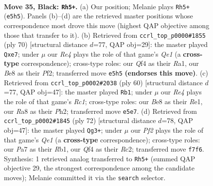 \documentclass[11pt]{article}
\begin{document}
\clearpage

\begin{figure}[p]\centering
\begin{subfigure}{0.46\textwidth}\centering
\resizebox{\linewidth}{!}{%
\newchessgame
\chessboard[
  setfen={r3b1k1/p4pP1/8/p3r3/4pq2/PP5K/1Q3P2/3RR3 b - - 1 35},
  showmover=false,
  pgfstyle=straightmove, color=movearrow, markmove={e5-h5}
]}
\caption{}
\end{subfigure}\hfill
\begin{subfigure}{0.46\textwidth}\centering
\resizebox{\linewidth}{!}{%
\newchessgame
\chessboard[
  setfen={6k1/r3qp2/2r3pp/P4B2/3p4/7P/2P2PP1/R3Q1K1 w - - 0 36},
  showmover=false,
  pgfstyle=straightmove, color=movearrow, markmove={e1-e7}
]}
\caption{}
\end{subfigure}
\\[4pt]
\begin{subfigure}{0.46\textwidth}\centering
\resizebox{\linewidth}{!}{%
\newchessgame
\chessboard[
  setfen={1r2r2k/6pp/8/p2QP3/8/qP6/6PP/2R1R1K1 w - - 1 31},
  showmover=false,
  pgfstyle=straightmove, color=movearrow, markmove={c1-b1}
]}
\caption{}
\end{subfigure}\hfill
\begin{subfigure}{0.46\textwidth}\centering
\resizebox{\linewidth}{!}{%
\newchessgame
\chessboard[
  setfen={1r1r4/6kp/pp6/3Bp2q/1PP2n2/8/2R4P/1R2Q2K w - - 4 37},
  showmover=false,
  pgfstyle=straightmove, color=movearrow, markmove={e1-g3}
]}
\caption{}
\end{subfigure}
\caption{\textbf{Move 35, Black: \texttt{Rh5+}.} (a) Our position; Melanie plays \texttt{Rh5+} (\texttt{e5h5}). Panels (b)--(d) are the retrieved master positions whose correspondence most drove this move (highest QAP objective among those that transfer to it). (b) Retrieved from \texttt{ccrl\_top\_p0000\#1855} (ply 70) [structural distance $d$=77, QAP obj=29]: the master played \texttt{Qxe7}; under $\mu$ our \emph{Re4} plays the role of that game's \emph{Qe1} (a \textbf{cross-type} correspondence); cross-type roles: our \emph{Q}f4 as their \emph{R}a1, our \emph{B}e8 as their \emph{P}f2; transferred move \texttt{e5h5} \textbf{(endorses this move)}. (c) Retrieved from \texttt{ccrl\_top\_p0002\#2038} (ply 60) [structural distance $d$=77, QAP obj=47]: the master played \texttt{Rb1}; under $\mu$ our \emph{Re4} plays the role of that game's \emph{Rc1}; cross-type roles: our \emph{B}e8 as their \emph{R}e1, our \emph{R}a8 as their \emph{P}h2; transferred move \texttt{e5e7}. (d) Retrieved from \texttt{ccrl\_top\_p0002\#1845} (ply 72) [structural distance $d$=78, QAP obj=47]: the master played \texttt{Qg3+}; under $\mu$ our \emph{Pf2} plays the role of that game's \emph{Qe1} (a \textbf{cross-type} correspondence); cross-type roles: our \emph{P}a7 as their \emph{R}b1, our \emph{Q}f4 as their \emph{R}c2; transferred move \texttt{f7f6}. Synthesis: 1 retrieved analog transferred to \texttt{Rh5+} (summed QAP objective 29, the strongest correspondence among the candidate moves); Melanie committed it via the \texttt{search} selector.}
\label{fig:thought-m69}
\end{figure}
\end{document}
